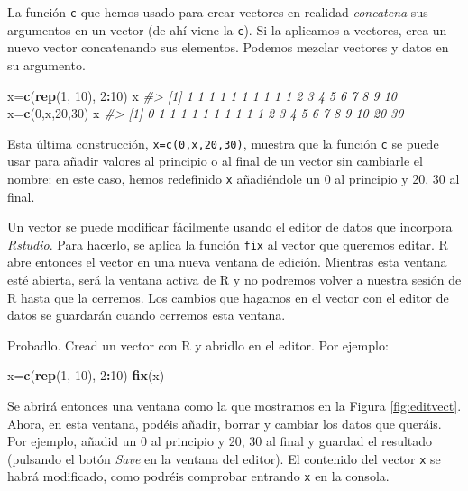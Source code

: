 \documentclass[
]{book}
\newenvironment{Shaded}{\begin{snugshade}}{\end{snugshade}}
\newcommand{\CommentTok}[1]{\textcolor[rgb]{0.56,0.35,0.01}{\textit{#1}}}
\newcommand{\DecValTok}[1]{\textcolor[rgb]{0.00,0.00,0.81}{#1}}
\newcommand{\KeywordTok}[1]{\textcolor[rgb]{0.13,0.29,0.53}{\textbf{#1}}}
\newcommand{\NormalTok}[1]{#1}
\newcommand{\OperatorTok}[1]{\textcolor[rgb]{0.81,0.36,0.00}{\textbf{#1}}}
\theoremstyle{definition}
\theoremstyle{definition}
\theoremstyle{definition}
\theoremstyle{remark}
\begin{document}
La función \texttt{c} que hemos usado para crear vectores en realidad \emph{concatena} sus argumentos en un vector (de ahí viene la \texttt{c}). Si la aplicamos a vectores, crea un nuevo vector concatenando sus elementos. Podemos mezclar vectores y datos en su argumento.

\begin{Shaded}
\begin{Highlighting}[]
\NormalTok{x=}\KeywordTok{c}\NormalTok{(}\KeywordTok{rep}\NormalTok{(}\DecValTok{1}\NormalTok{, }\DecValTok{10}\NormalTok{), }\DecValTok{2}\OperatorTok{:}\DecValTok{10}\NormalTok{)}
\NormalTok{x}
\CommentTok{\#\textgreater{}  [1]  1  1  1  1  1  1  1  1  1  1  2  3  4  5  6  7  8  9 10}
\NormalTok{x=}\KeywordTok{c}\NormalTok{(}\DecValTok{0}\NormalTok{,x,}\DecValTok{20}\NormalTok{,}\DecValTok{30}\NormalTok{)}
\NormalTok{x}
\CommentTok{\#\textgreater{}  [1]  0  1  1  1  1  1  1  1  1  1  1  2  3  4  5  6  7  8  9 10 20 30}
\end{Highlighting}
\end{Shaded}

Esta última construcción, \texttt{x=c(0,x,20,30)}, muestra que la función \texttt{c} se puede usar para añadir valores al principio o al final de un vector sin cambiarle el nombre: en este caso, hemos redefinido \texttt{x} añadiéndole un 0 al principio y 20, 30 al final.

Un vector se puede modificar fácilmente usando el editor de datos que incorpora \emph{Rstudio}. Para hacerlo, se aplica la función \texttt{fix} al vector que queremos editar. R abre entonces el vector en una nueva ventana de edición. Mientras esta ventana esté abierta, será la ventana activa de R y no podremos volver a nuestra sesión de R hasta que la cerremos. Los cambios que hagamos en el vector con el editor de datos se guardarán cuando cerremos esta ventana.

Probadlo. Cread un vector con R y abridlo en el editor. Por ejemplo:

\begin{Shaded}
\begin{Highlighting}[]
\NormalTok{x=}\KeywordTok{c}\NormalTok{(}\KeywordTok{rep}\NormalTok{(}\DecValTok{1}\NormalTok{, }\DecValTok{10}\NormalTok{), }\DecValTok{2}\OperatorTok{:}\DecValTok{10}\NormalTok{)}
\KeywordTok{fix}\NormalTok{(x)}
\end{Highlighting}
\end{Shaded}

Se abrirá entonces una ventana como la que mostramos en la Figura \ref{fig:editvect}. Ahora, en esta ventana, podéis añadir, borrar y cambiar los datos que queráis. Por ejemplo, añadid un 0 al principio y 20, 30 al final y guardad el resultado (pulsando el botón \emph{Save} en la ventana del editor). El contenido del vector \texttt{x} se habrá modificado, como podréis comprobar entrando \texttt{x} en la consola.
\end{document}
